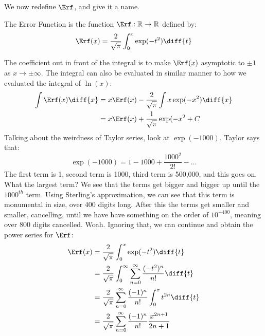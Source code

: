 \documentclass[crop=false,class=book,oneside]{standalone}
\begin{document}
        We now redefine $\Erf$, and give it a name.
        \begin{definition}
            The Error Function is the function
            $\Erf:\mathbb{R}\rightarrow\mathbb{R}$ defined by:
            \begin{equation}
                \Erf(x)=\frac{2}{\sqrt{\pi}}
                    \int_{0}^{x}\exp(-t^{2})\diff{t}
            \end{equation}
        \end{definition}
        The coefficient out in front of the integral is to make
        $\Erf(x)$ asymptotic to $\pm{1}$ as $x\rightarrow\pm\infty$.
        The integral can also be evaluated in similar manner to
        how we evaluated the integral of $\ln(x)$:
        \begin{align}
            \int\Erf(x)\diff{x}
            &=x\Erf(x)-\frac{2}{\sqrt{\pi}}
                \int{x}\exp(-x^{2})\diff{x}\\
            &=x\Erf(x)+\frac{1}{\sqrt{\pi}}\exp(-x^{2}+C
        \end{align}
        Talking about the weirdness of Taylor series, look at
        $\exp(-1000)$. Taylor says that:
        \begin{equation}
            \exp(-1000)=1-1000+\frac{1000^{2}}{2!}-\hdots
        \end{equation}
        The first term is 1, second term is 1000, third term
        is 500,000, and this goes on. What the largest term?
        We see that the terms get bigger and bigger up until
        the $1000^{th}$ term. Using Sterling's approximation,
        we can see that this term is monumental in size,
        over 400 digits long. After this the terms get smaller
        and smaller, cancelling, until we have have
        something on the order of $10^{-400}$, meaning over
        800 digits cancelled. Woah. Ignoring that, we can
        continue and obtain the power series for $\Erf$:
        \begin{align}
            \Erf(x)&=\frac{2}{\sqrt{\pi}}
                \int_{0}^{x}\exp(-t^{2})\diff{t}\\
            &=\frac{2}{\sqrt{\pi}}\int_{0}^{\infty}
                \sum_{n=0}^{\infty}\frac{(-t^{2})^{n}}{n!}
                \diff{t}\\
            &=\frac{2}{\sqrt{\pi}}
                \sum_{n=0}^{\infty}\frac{(-1)^{n}}{n!}
                \int_{0}^{x}t^{2n}\diff{t}\\
            &=\frac{2}{\sqrt{\pi}}\sum_{n=0}^{\infty}
                \frac{(-1)^{n}}{n!}\frac{x^{2n+1}}{2n+1}
        \end{align}
\end{document}
